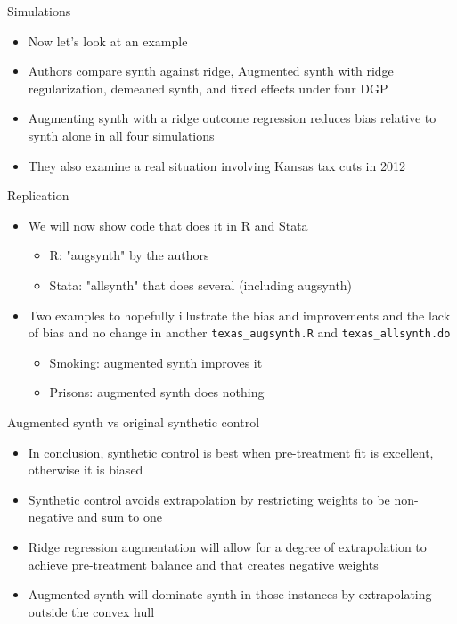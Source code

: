 \documentclass{beamer}
\begin{document}
\begin{frame}{Simulations}

\begin{itemize}
\item Now let's look at an example
\item Authors compare synth against ridge, Augmented synth with ridge regularization, demeaned synth, and fixed effects under four DGP
\item Augmenting synth with a ridge outcome regression reduces bias relative to synth alone in all four simulations
\item They also examine a real situation involving Kansas tax cuts in 2012
\end{itemize}

\end{frame}



\begin{frame}{Replication}

\begin{itemize}
\item We will now show code that does it in R and Stata
	\begin{itemize}
	\item R: "augsynth" by the authors
	\item Stata: "allsynth" that does several (including augsynth)
	\end{itemize}
\item Two examples to hopefully illustrate the bias and improvements and the lack of bias and no change in another \texttt{texas_augsynth.R} and \texttt{texas_allsynth.do}
	\begin{itemize}
	\item Smoking: augmented synth improves it
	\item Prisons: augmented synth does nothing
	\end{itemize}
\end{itemize}

\end{frame}



\begin{frame}{Augmented synth vs original synthetic control}

\begin{itemize}
\item In conclusion, synthetic control is best when pre-treatment fit is excellent, otherwise it is biased
\item Synthetic control avoids extrapolation by restricting weights to be non-negative and sum to one
\item Ridge regression augmentation will allow for a degree of extrapolation to achieve pre-treatment balance and that creates negative weights
\item Augmented synth will dominate synth in those instances by extrapolating outside the convex hull
\end{itemize}

\end{frame}
\end{document}

